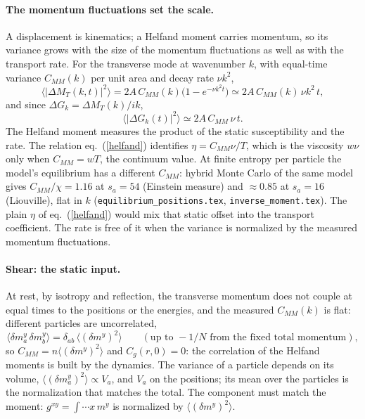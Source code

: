 \documentclass[11pt,aps,preprint,nofootinbib,superscriptaddress,tightenlines]{revtex4-2}
\def\st{\begin{equation}}
\def\stp{\end{equation}}
\def\Eq#1{eq.~(\ref{#1})}
\newcommand{\avg}[1]{\langle #1\rangle}
\let\oldparagraph\paragraph
\renewcommand{\paragraph}{\par\bigskip\oldparagraph}
\begin{document}
\paragraph{The momentum fluctuations set the scale.}  A displacement is kinematics; a Helfand moment carries momentum, so its variance
grows with the size of the momentum fluctuations as well as with the transport rate.  For the transverse mode at wavenumber $k$, with
equal-time variance $C_{MM}(k)$ per unit area and decay rate $\nu k^2$,
\st
\avg{|\Delta M_T(k,t)|^2}=2A\,C_{MM}(k)\big(1-e^{-\nu k^2t}\big)\simeq2A\,C_{MM}(k)\,\nu k^2\,t ,
\stp
and since $\Delta G_k=\Delta M_T(k)/ik$,
\st
\avg{|\Delta G_k(t)|^2}\simeq2A\,C_{MM}\,\nu\,t .
\stp
The Helfand moment measures the product of the static susceptibility and the rate.  The relation \Eq{helfand} identifies $\eta=C_{MM}\nu/T$, which is
the viscosity $w\nu$ only when $C_{MM}=wT$, the continuum value.  At finite entropy per particle the model's equilibrium has a different
$C_{MM}$: hybrid Monte Carlo of the same model gives $C_{MM}/\chi=1.16$ at $s_a=54$ (Einstein measure) and $\approx0.85$ at $s_a=16$ (Liouville),
flat in $k$ (\texttt{equilibrium\_positions.tex}, \texttt{inverse\_moment.tex}).  The plain $\eta$ of \Eq{helfand} would mix that static offset into
the transport coefficient.  The rate is free of it when the variance is normalized by the measured momentum fluctuations.

\paragraph{Shear: the static input.}  At rest, by isotropy and reflection, the transverse momentum does not couple at equal times to the
positions or the energies, and the measured $C_{MM}(k)$ is flat: different particles are uncorrelated,
\st
\avg{\delta m_a^y\,\delta m_b^y}=\delta_{ab}\,\avg{(\delta m^y)^2}\qquad(\text{up to }-1/N\text{ from the fixed total momentum}),
\stp
so $C_{MM}=n\avg{(\delta m^y)^2}$ and $C_g(r,0)=0$: the correlation of the Helfand moments is built by the dynamics.  The variance of a
particle depends on its volume, $\avg{(\delta m_a^y)^2}\propto V_a$, and $V_a$ on the positions; its mean over the particles is the
normalization that matches the total.  The component must match the moment: $g^{xy}=\int\cdots x\,m^y$ is normalized by $\avg{(\delta m^y)^2}$.
\end{document}

